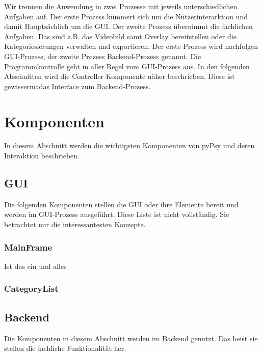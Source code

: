 \documentclass[a4paper,draft]{scrartcl}
\begin{document}
Wir trennen die Anwendung in zwei Prozesse mit jeweils unterschiedlichen Aufgaben auf.
Der erste Prozess k\"ummert sich um die Nutzerinterarktion und damit Haupts\"achlich um die GUI.
Der zweite Prozess \"ubernimmt die fachlichen Aufgaben. Das sind z.B. das Videobild samt Overlay bereitstellen oder die Kategoriesierungen verwalten und exportieren.
Der erste Prozess wird nachfolgen GUI-Prozess, der zweite Prozess Backend-Prozess genannt.
Die Programmkontrolle geht in aller Regel vom GUI-Prozess aus.
In den folgenden Abschnitten wird die Controller Komponente n\"aher beschrieben.
Diese ist gewisserma\ssen das Interface zum Backend-Prozess.

\section{Komponenten}
In diesem Abschnitt werden die wichtigsten Komponenten von pyPsy und deren Interaktion beschrieben.

\subsection{GUI}
Die folgenden Komponenten stellen die GUI oder ihre Elemente bereit und werden im GUI-Prozess ausgef\"uhrt.
Diese Liste ist nicht vollst\"andig.
Sie betrachtet nur die interessantesten Konzepte.

\subsubsection{MainFrame}
Ist das ein und alles

\subsubsection{CategoryList}

\subsection{Backend}
Die Komponenten in diesem Abschnitt werden im Backend genutzt.
Das hei\"st sie stellen die fachliche Funktionalit\"at her.
\end{document}
